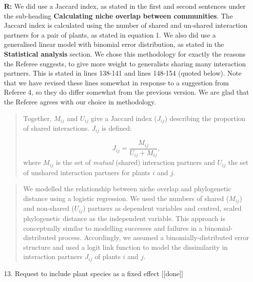 \documentclass[12pt]{letter}
\begin{document}
		\textbf{R:} We did use a Jaccard index, as stated in the first and second sentences under the sub-heading \textbf{Calculating niche overlap between communities}. The Jaccard index is calculated using the number of shared and un-shared interaction partners for a pair of plants, as stated in equation 1. We also did use a generalised linear model with binomial error distribution, as stated in the \textbf{Statistical analysis} section. We chose this methodology for exactly the reasons the Referee suggests, to give more weight to generalists sharing many interaction partners. This is stated in lines 138-141 and lines 148-154 (quoted below). Note that we have revised these lines somewhat in response to a suggestion from Referee 4, so they do differ somewhat from the previous version. We are glad that the Referee agrees with our choice in methodology.

		\begin{quotation}

			Together, $M_{ij}$ and $U_{ij}$ give a Jaccard index ($J_{ij}$) describing 
			the proportion of shared interactions. $J_{ij}$ is defined: 

			\begin{equation}
			J_{ij} = \frac{M_{ij}}{U_{ij}+M_{ij}} ,
			\end{equation}
			where $M_{ij}$ is the set of \emph{mutual} (shared) interaction partners and $U_{ij}$ the set of unshared interaction partners for plants $i$ and $j$.

		\end{quotation}

		\smallskip

		\begin{quotation}

			We modelled the relationship between niche overlap and phylogenetic 
			distance using a logistic regression. We used the numbers of shared 
			($M_{ij}$) and non-shared ($U_{ij}$) partners as dependent variables and 
			centred, scaled phylogenetic distance as the independent variable. This 
			approach is conceptually similar to modelling successes and failures in a 
			binomial-distributed process. Accordingly, we assumed a binomially-distributed error structure and used a logit link function to model the dissimilarity in interaction partners 
			$J_{ij}$ of plants $i$ and $j$.

		\end{quotation}


	13. Request to include plant species as a fixed effect [[done]]
\end{document}

